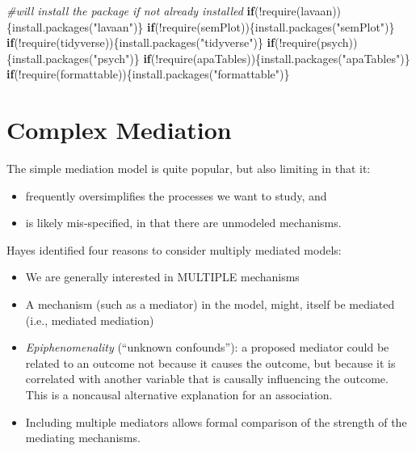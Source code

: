 \documentclass[
  english,
]{book}
\newenvironment{Shaded}{\begin{snugshade}}{\end{snugshade}}
\newcommand{\CommentTok}[1]{\textcolor[rgb]{0.56,0.35,0.01}{\textit{#1}}}
\newcommand{\ControlFlowTok}[1]{\textcolor[rgb]{0.13,0.29,0.53}{\textbf{#1}}}
\newcommand{\FunctionTok}[1]{\textcolor[rgb]{0.00,0.00,0.00}{#1}}
\newcommand{\NormalTok}[1]{#1}
\newcommand{\SpecialCharTok}[1]{\textcolor[rgb]{0.00,0.00,0.00}{#1}}
\newcommand{\StringTok}[1]{\textcolor[rgb]{0.31,0.60,0.02}{#1}}
\providecommand{\tightlist}{%
  \setlength{\itemsep}{0pt}\setlength{\parskip}{0pt}}
\begin{document}
\begin{Shaded}
\begin{Highlighting}[]
\CommentTok{\#will install the package if not already installed}
\ControlFlowTok{if}\NormalTok{(}\SpecialCharTok{!}\FunctionTok{require}\NormalTok{(lavaan))\{}\FunctionTok{install.packages}\NormalTok{(}\StringTok{"lavaan"}\NormalTok{)\}}
\ControlFlowTok{if}\NormalTok{(}\SpecialCharTok{!}\FunctionTok{require}\NormalTok{(semPlot))\{}\FunctionTok{install.packages}\NormalTok{(}\StringTok{"semPlot"}\NormalTok{)\}}
\ControlFlowTok{if}\NormalTok{(}\SpecialCharTok{!}\FunctionTok{require}\NormalTok{(tidyverse))\{}\FunctionTok{install.packages}\NormalTok{(}\StringTok{"tidyverse"}\NormalTok{)\}}
\ControlFlowTok{if}\NormalTok{(}\SpecialCharTok{!}\FunctionTok{require}\NormalTok{(psych))\{}\FunctionTok{install.packages}\NormalTok{(}\StringTok{"psych"}\NormalTok{)\}}
\ControlFlowTok{if}\NormalTok{(}\SpecialCharTok{!}\FunctionTok{require}\NormalTok{(apaTables))\{}\FunctionTok{install.packages}\NormalTok{(}\StringTok{"apaTables"}\NormalTok{)\}}
\ControlFlowTok{if}\NormalTok{(}\SpecialCharTok{!}\FunctionTok{require}\NormalTok{(formattable))\{}\FunctionTok{install.packages}\NormalTok{(}\StringTok{"formattable"}\NormalTok{)\}}
\end{Highlighting}
\end{Shaded}

\hypertarget{complex-mediation}{%
\section{Complex Mediation}\label{complex-mediation}}

The simple mediation model is quite popular, but also limiting in that it:

\begin{itemize}
\tightlist
\item
  frequently oversimplifies the processes we want to study, and
\item
  is likely mis-specified, in that there are unmodeled mechanisms.
\end{itemize}

Hayes \citeyearpar{hayes_introduction_2018} identified four reasons to consider multiply mediated models:

\begin{itemize}
\tightlist
\item
  We are generally interested in MULTIPLE mechanisms
\item
  A mechanism (such as a mediator) in the model, might, itself be mediated (i.e., mediated mediation)
\item
  \emph{Epiphenomenality} (``unknown confounds''): a proposed mediator could be related to an outcome not because it causes the outcome, but because it is correlated with another variable that is causally influencing the outcome. This is a noncausal alternative explanation for an association.
\item
  Including multiple mediators allows formal comparison of the strength of the mediating mechanisms.
\end{itemize}
\end{document}
